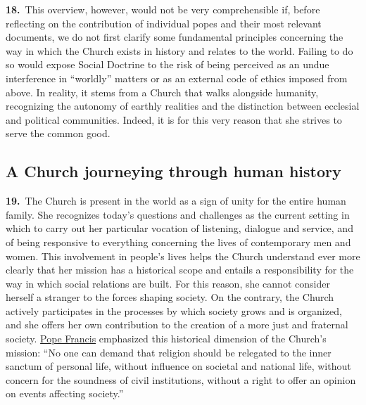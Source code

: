 \documentclass{article}
\begin{document}
\textbf{18.}\ This overview, however, would not be very comprehensible if, before reflecting on the contribution of individual popes and their most relevant documents, we do not first clarify some fundamental principles concerning the way in which the Church exists in history and relates to the world. Failing to do so would expose Social Doctrine to the risk of being perceived as an undue interference in ``worldly'' matters or as an external code of ethics imposed from above. In reality, it stems from a Church that walks alongside humanity, recognizing the autonomy of earthly realities and the distinction between ecclesial and political communities. Indeed, it is for this very reason that she strives to serve the common good.

\subsection{A Church journeying through human history}

\textbf{19.}\ The Church is present in the world as a sign of unity for the entire human family. She recognizes today's questions and challenges as the current setting in which to carry out her particular vocation of listening, dialogue and service, and of being responsive to everything concerning the lives of contemporary men and women. This involvement in people's lives helps the Church understand ever more clearly that her mission has a historical scope and entails a responsibility for the way in which social relations are built. For this reason, she cannot consider herself a stranger to the forces shaping society. On the contrary, the Church actively participates in the processes by which society grows and is organized, and she offers her own contribution to the creation of a more just and fraternal society. \href{https://www.vatican.va/content/francesco/en.html}{Pope Francis} emphasized this historical dimension of the Church's mission: ``No one can demand that religion should be relegated to the inner sanctum of personal life, without influence on societal and national life, without concern for the soundness of civil institutions, without a right to offer an opinion on events affecting society.''\cite{n9}
\end{document}
